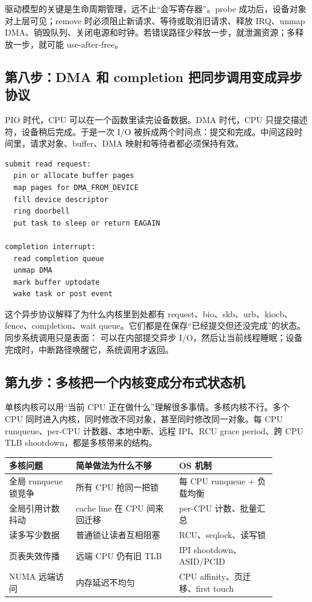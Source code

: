 驱动模型的关键是生命周期管理，远不止“会写寄存器”。probe 成功后，设备对象对上层可见；remove 时必须阻止新请求、等待或取消旧请求、释放 IRQ、unmap DMA、销毁队列、关闭电源和时钟。若错误路径少释放一步，就泄漏资源；多释放一步，就可能 use-after-free。

\subsection{第八步：DMA 和 completion 把同步调用变成异步协议}

PIO 时代，CPU 可以在一个函数里读完设备数据。DMA 时代，CPU 只提交描述符，设备稍后完成。于是一次 I/O 被拆成两个时间点：提交和完成。中间这段时间里，请求对象、buffer、DMA 映射和等待者都必须保持有效。

\begin{lstlisting}
submit read request:
  pin or allocate buffer pages
  map pages for DMA_FROM_DEVICE
  fill device descriptor
  ring doorbell
  put task to sleep or return EAGAIN

completion interrupt:
  read completion queue
  unmap DMA
  mark buffer uptodate
  wake task or post event
\end{lstlisting}

这个异步协议解释了为什么内核里到处都有 request、bio、skb、urb、kiocb、fence、completion、wait queue。它们都是在保存“已经提交但还没完成”的状态。同步系统调用只是表面： 可以在内部提交异步 I/O，然后让当前线程睡眠；设备完成时，中断路径唤醒它，系统调用才返回。

\subsection{第九步：多核把一个内核变成分布式状态机}

单核内核可以用“当前 CPU 正在做什么”理解很多事情。多核内核不行。多个 CPU 同时进入内核，同时修改不同对象，甚至同时修改同一对象。每 CPU runqueue、per-CPU 计数器、本地中断、远程 IPI、RCU grace period、跨 CPU TLB shootdown，都是多核带来的结构。

\begin{longtable}{p{0.22\linewidth}p{0.34\linewidth}p{0.32\linewidth}}
\toprule
多核问题 & 简单做法为什么不够 & OS 机制 \\
\midrule
全局 runqueue 锁竞争 & 所有 CPU 抢同一把锁 & 每 CPU runqueue + 负载均衡 \\
全局引用计数抖动 & cache line 在 CPU 间来回迁移 & per-CPU 计数、批量汇总 \\
读多写少数据 & 普通锁让读者互相阻塞 & RCU、seqlock、读写锁 \\
页表失效传播 & 远端 CPU 仍有旧 TLB & IPI shootdown、ASID/PCID \\
NUMA 远端访问 & 内存延迟不均匀 & CPU affinity、页迁移、first touch \\
\bottomrule
\end{longtable}

